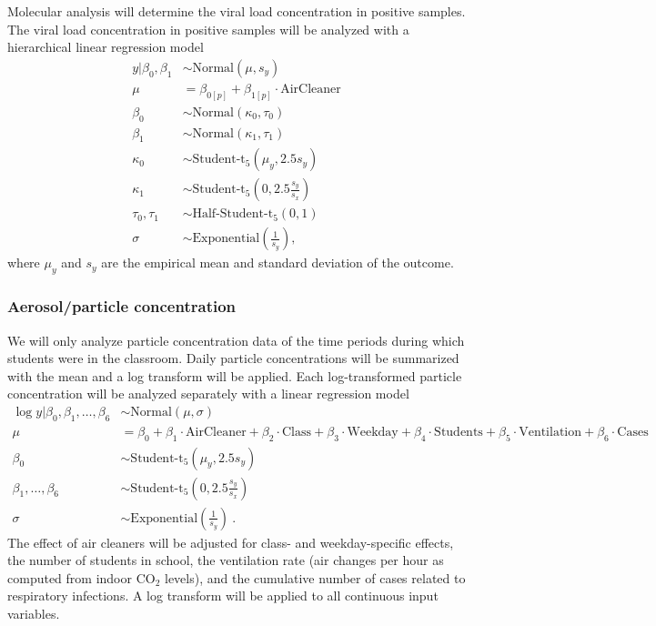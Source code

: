 \documentclass{article}
\begin{document}
Molecular analysis will determine the viral load concentration in positive samples. The viral load concentration in positive samples will be analyzed with a hierarchical linear regression model 
\begin{align*}
    y | \beta_0, \beta_1 &\sim \text{Normal}(\mu,s_{y}) \\
    \mu &= \beta_{0[p]} + \beta_{1[p]} \cdot \text{AirCleaner} \\
    \beta_0 &\sim \text{Normal}(\kappa_0, \tau_0) \\
    \beta_1 &\sim \text{Normal}(\kappa_1, \tau_1) \\
    \kappa_0 &\sim \text{Student-t}_5(\mu_{y}, 2.5s_{y}) \\
    \kappa_1 &\sim \text{Student-t}_5\left(0, 2.5\frac{s_{y}}{s_{x}}\right) \\
    \tau_0, \tau_1 &\sim \text{Half-Student-t}_5(0,1) \\
    \sigma &\sim \text{Exponential}\left(\frac{1}{s_{y}}\right),
\end{align*}
where $\mu_{y}$ and $s_{y}$ are the empirical mean and standard deviation of the outcome. 

\subsubsection{Aerosol/particle concentration}\label{subsubsec:aerosol}

We will only analyze particle concentration data of the time periods during which students were in the classroom. Daily particle concentrations will be summarized with the mean and a log transform will be applied. Each log-transformed particle concentration will be analyzed separately with a linear regression model 
\begin{align*}
    \log y | \beta_0, \beta_1, \dots, \beta_6 &\sim \text{Normal}(\mu,\sigma) \\
    \mu &= \beta_0 + \beta_1 \cdot \text{AirCleaner} + \beta_2 \cdot \text{Class} + \beta_3 \cdot \text{Weekday} + \beta_4 \cdot \text{Students} + \beta_5 \cdot \text{Ventilation} + \beta_6 \cdot \text{Cases}\\
    \beta_0 &\sim \text{Student-t}_5(\mu_y, 2.5s_{y}) \\
    \beta_1, \dots, \beta_6 &\sim \text{Student-t}_5\left(0, 2.5\frac{s_{y}}{s_{x}}\right) \\
    \sigma &\sim \text{Exponential}\left(\frac{1}{s_{y}}\right)~.
\end{align*}
The effect of air cleaners will be adjusted for class- and weekday-specific effects, the number of students in school, the ventilation rate (air changes per hour as computed from indoor CO$_2$ levels), and the cumulative number of cases related to respiratory infections. A log transform will be applied to all continuous input variables. 
\end{document}
